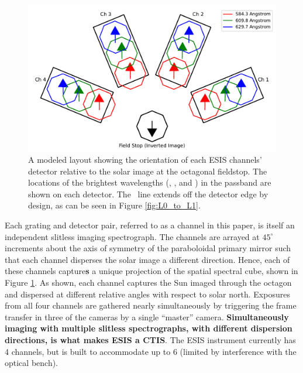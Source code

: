 \documentclass[linenumbers,trackchanges]{aastex63}
\begin{document}
        \begin{figure}
			\begin{center}
				\includegraphics{detector_layout}
				\caption{A modeled layout showing the orientation of each ESIS channels' detector relative to the solar image at the octagonal fieldstop.  The locations of the brightest wavelengths (\hei, \mgxbright, and \ov) in the passband are shown on each detector.  The \hei \ line  extends off the detector edge by design, as can be seen in Figure \ref{fig:L0_to_L1}. }
				\label{fig:level_1_array}
			\end{center}
		\end{figure}

    	Each grating and detector pair, referred to as a channel in this paper,
    	is itself an independent slitless imaging spectrograph.  
    	The channels are arrayed at $45^{\circ}$ increments about the axis of symmetry of the paraboloidal primary mirror such that each channel disperses the solar image a different direction. 
    	Hence, each of these channels capture\textbf{s} a unique projection of the spatial spectral cube, shown in Figure \ref{fig:level_1_array}. 
    	As shown, each channel captures the Sun imaged through the octagon and dispersed at different relative angles with respect to solar north. 
    	Exposures from all four channels are gathered nearly simultaneously by triggering the frame transfer in three of the cameras by a single ``master'' camera. 
    	\textbf{Simultaneously imaging with multiple slitless spectrographs, with different dispersion directions, is what makes ESIS a CTIS}. 
    	The ESIS instrument currently has 4 channels, but is built to accommodate up to 6 (limited by interference with the optical bench).

    
\end{document}
